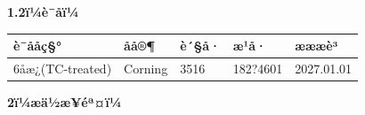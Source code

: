 \documentclass[UTF8,10pt,a4paper,fontset=fandol]{ctexart}
\newcommand{\fieldvalue}[1]{#1}
\newcommand{\handwritten}[1]{#1}
\begin{document}
\textbf{1.2ï¼è¯åï¼}

\begin{tabularx}{\textwidth}{|X|X|X|X|X|}
\hline
è¯ååç§° & åå®¶ & è´§å· & æ¹å· & æææè³ \\ \hline
\fieldvalue{6å­æ¿(TC-treated)} &
\fieldvalue{Corning} &
\fieldvalue{3516} &
\fieldvalue{\handwritten{182?4601}} &
\fieldvalue{\handwritten{2027.01.01}}
\\ \hline
\end{tabularx}

\textbf{2ï¼æä½æ­¥éª¤ï¼}
\end{document}
